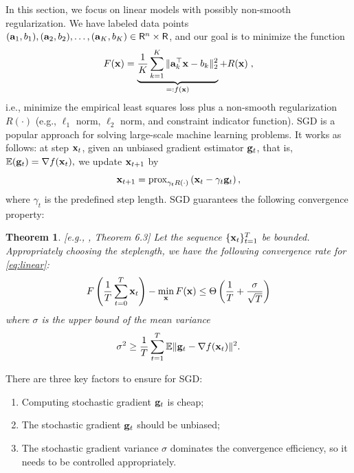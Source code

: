 \documentclass{article}
\newcommand{\R}{\mathsf{R}}
\def\a{{\bf a}}
\def\g{{\bf g}}
\def\x{{\bf x}}
\def\E{\mathbb{E}}
\newtheorem{theorem}{Theorem}
\begin{document}
\vspace{-0.5em}
In this section, we focus on linear models with possibly non-smooth regularization. We have labeled data points $(\a_1, b_1), (\a_2, b_2), \ldots, (\a_K, b_K) \in \R^n \times \R$, and our goal is to minimize the function
\vspace{-0.5em}
\begin{align}
F(\x) = \underbrace{\frac{1}{K} \sum_{k = 1}^K \| \a_k^\top \x - b_k \|_2^2}_{=: f(\x)} + R(\x) \; ,
\label{eq:linear}
\end{align}
i.e., minimize the empirical least squares loss plus a non-smooth regularization $R(\cdot)$ (e.g., $\ell_1$ norm, $\ell_2$ norm, and constraint indicator function). SGD is a popular approach for solving large-scale machine learning problems. It works as follows: at step $\x_t$, given an unbiased gradient estimator $\g_t$, that is, 
$\E(\g_t) = \nabla f(\x_t),$
we update $\x_{t+1}$ by
\[
\x_{t+1} = \text{prox}_{\gamma_t R(\cdot)}\left( \x_t - \gamma_t \g_t\right),
\]
where $\gamma_t$ is the predefined step length. SGD guarantees the following convergence property:
\begin{theorem}\label{thm:sgd-conv}[e.g., \cite{2014arXiv1405.4980B}, Theorem 6.3]
Let the sequence $\{\x_t\}_{t=1}^T$ be bounded. Appropriately choosing the steplength,
we have the following convergence rate for \eqref{eq:linear}:
% 
\begin{equation}
F\left(\frac{1}{T} \sum_{t = 0}^T \x_t\right) - \min_{\x}F(\x) \leq \Theta\left({1\over T} + {\sigma \over \sqrt{T}}\right) 
\label{eq:sgd-conv}
\end{equation}
where $\sigma$ is the upper bound of the mean variance 
\[
\sigma^2 \geq {1\over T}\sum_{t=1}^T \E\|\g_t - \nabla f(\x_t)\|^2. 
\]
\end{theorem} 
\vspace{-2em}
There are three key factors to ensure for SGD:
\begin{enumerate}
\vspace{-0.75em}
\item Computing stochastic gradient $\g_t$ is cheap;
\vspace{-0.75em}
\item The stochastic gradient $\g_t$ should be unbiased;
\vspace{-0.75em}
\item The stochastic gradient variance $\sigma$ dominates the convergence efficiency, so it needs to be controlled appropriately.
\end{enumerate}
\end{document}
